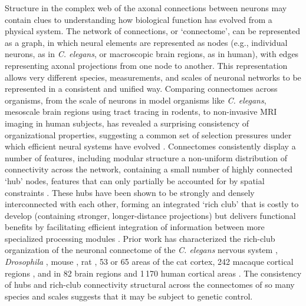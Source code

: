 \documentclass[10pt,letterpaper]{article}
\begin{document}
Structure in the complex web of the axonal connections between neurons may contain clues to understanding how biological function has evolved from a physical system.
The network of connections, or `connectome', can be represented as a graph, in which neural elements are represented as nodes (e.g., individual neurons, as in \emph{C. elegans}, or macroscopic brain regions, as in human), with edges representing axonal projections from one node to another.
This representation allows very different species, measurements, and scales of neuronal networks to be represented in a consistent and unified way.
Comparing connectomes across organisms, from the scale of neurons in model organisms like \emph{C. elegans}, mesoscale brain regions using tract tracing in rodents, to non-invasive MRI imaging in human subjects, has revealed a surprising consistency of organizational properties, suggesting a common set of selection pressures under which efficient neural systems have evolved \cite{vandenHeuvel:2016eg}.
Connectomes consistently display a number of features, including modular structure a non-uniform distribution of connectivity across the network, containing a small number of highly connected `hub' nodes, features that can only partially be accounted for by spatial constraints \cite{Henderson:2014fg, Roberts:2016il}.
These hubs have been shown to be strongly and densely interconnected with each other, forming an integrated `rich club' that is costly to develop (containing stronger, longer-distance projections) but delivers functional benefits by facilitating efficient integration of information between more specialized processing modules \cite{VandenHeuvel2012}.
Prior work has characterized the rich-club organization of the neuronal connectome of the \emph{C. elegans} nervous system \cite{Towlson:2013gf}, \emph{Drosophila} \cite{Shih:2015cu}, mouse \cite{Fulcher:2016ck}, rat \cite{vandenHeuvel:2015ie}, 53 \cite{ZamoraLopez:2010hy} or 65 areas \cite{deReus:2013cy} of the cat cortex, 242 macaque cortical regions \cite{Harriger:2012bb}, and in 82 brain regions \cite{vandenHeuvel:2011he} and 1\,170 human cortical areas \cite{vandenHeuvel:2012kh}.
The consistency of hubs and rich-club connectivity structural across the connectomes of so many species and scales suggests that it may be subject to genetic control.
\end{document}
